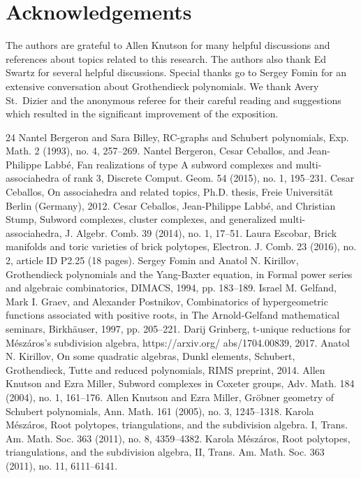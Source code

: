 \documentclass[10pt]{amsart}
\theoremstyle{definition}
\numberwithin{equation}{section}
\newcommand{\longthanks}[1]{\section*{Acknowledgements}#1}
\newcommand*\+{\smash{\lower2pt\hbox{\rlap{\vrule height14pt}}\raise2pt\hbox{\rlap{\hskip-3pt \vrule height.4pt depth0pt width14.7pt}}}}
\begin{document}
\longthanks{The authors are grateful to Allen Knutson for many helpful discussions and references about topics related to this research. The authors also thank Ed Swartz for several helpful discussions. Special thanks go to Sergey Fomin for an extensive conversation about Grothendieck polynomials. We thank Avery St.~Dizier and the anonymous referee for their careful reading and suggestions which resulted in the significant improvement of the exposition.}
\begin{thebibliography}{24}
 Nantel Bergeron and Sara Billey, RC-graphs and Schubert polynomials, Exp. Math. 2 (1993), no. 4, 257–269.
 Nantel Bergeron, Cesar Ceballos, and Jean-Philippe Labbé, Fan realizations of type A subword complexes and multi-associahedra of rank 3, Discrete Comput. Geom. 54 (2015), no. 1, 195–231.
 Cesar Ceballos, On associahedra and related topics, Ph.D. thesis, Freie Universität Berlin (Germany), 2012.
 Cesar Ceballos, Jean-Philippe Labbé, and Christian Stump, Subword complexes, cluster complexes, and generalized multi-associahedra, J. Algebr. Comb. 39 (2014), no. 1, 17–51.
 Laura Escobar, Brick manifolds and toric varieties of brick polytopes, Electron. J. Comb. 23 (2016), no. 2, article ID P2.25 (18 pages).
 Sergey Fomin and Anatol N. Kirillov, Grothendieck polynomials and the Yang-Baxter equation, in Formal power series and algebraic combinatorics, DIMACS, 1994, pp. 183–189.
 Israel M. Gelfand, Mark I. Graev, and Alexander Postnikov, Combinatorics of hypergeometric functions associated with positive roots, in The Arnold-Gelfand mathematical seminars, Birkhäuser, 1997, pp. 205–221.
 Darij Grinberg, t-unique reductions for Mészáros’s subdivision algebra, https://arxiv.org/ abs/1704.00839, 2017.
 Anatol N. Kirillov, On some quadratic algebras, Dunkl elements, Schubert, Grothendieck, Tutte and reduced polynomials, RIMS preprint, 2014.
 Allen Knutson and Ezra Miller, Subword complexes in Coxeter groups, Adv. Math. 184 (2004), no. 1, 161–176.
 Allen Knutson and Ezra Miller, Gröbner geometry of Schubert polynomials, Ann. Math. 161 (2005), no. 3, 1245–1318.
 Karola Mészáros, Root polytopes, triangulations, and the subdivision algebra. I, Trans. Am. Math. Soc. 363 (2011), no. 8, 4359–4382.
 Karola Mészáros, Root polytopes, triangulations, and the subdivision algebra, II, Trans. Am. Math. Soc. 363 (2011), no. 11, 6111–6141.

\end{thebibliography}
\end{document}
